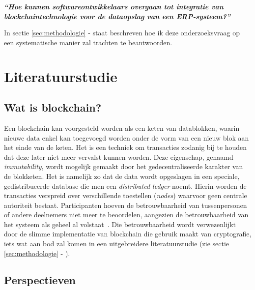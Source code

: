 \begin{center}
	\textit{\textbf{``Hoe kunnen softwareontwikkelaars overgaan tot integratie van blockchaintechnologie voor de dataopslag van een ERP-systeem?''}}
\end{center}

In sectie \ref{sec:methodologie} -  staat beschreven hoe ik deze onderzoeksvraag op een systematische manier zal trachten te beantwoorden.




\section{Literatuurstudie}
\label{sec:state-of-the-art}

\subsection{Wat is blockchain?}
\label{sub:wat-is-blockchain}

Een blockchain kan voorgesteld worden als een keten van datablokken, waarin nieuwe data enkel kan toegevoegd worden onder de vorm van een nieuw blok aan het einde van de keten. Het is een techniek om transacties zodanig bij te houden dat deze later niet meer vervalst kunnen worden. Deze eigenschap, genaamd \textit{immutability}, wordt mogelijk gemaakt door het gedecentraliseerde karakter van de blokketen. Het is namelijk zo dat de data wordt opgeslagen in een speciale, gedistribueerde database die men een \textit{distributed ledger} noemt. Hierin worden de transacties verspreid over verschillende toestellen (\textit{nodes}) waarvoor geen centrale autoriteit bestaat. Participanten hoeven de betrouwbaarheid van tussenpersonen of andere deelnemers niet meer te beoordelen, aangezien de betrouwbaarheid van het systeem als geheel al volstaat~\autocite{Nofer2017}. Die betrouwbaarheid wordt verwezenlijkt door de slimme implementatie van blockchain die gebruik maakt van cryptografie, iets wat aan bod zal komen in een uitgebreidere literatuurstudie (zie sectie \ref{sec:methodologie} - ).



\subsection{Perspectieven}
\label{sub:perspectieven}

